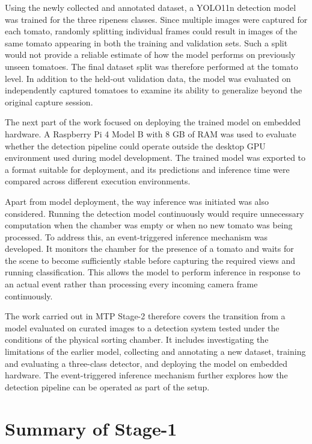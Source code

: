\documentclass[12pt,a4paper]{report}
\begin{document}
Using the newly collected and annotated dataset, a YOLO11n detection model was trained for the three ripeness classes. Since multiple images were captured for each tomato, randomly splitting individual frames could result in images of the same tomato appearing in both the training and validation sets. Such a split would not provide a reliable estimate of how the model performs on previously unseen tomatoes. The final dataset split was therefore performed at the tomato level. In addition to the held-out validation data, the model was evaluated on independently captured tomatoes to examine its ability to generalize beyond the original capture session.

The next part of the work focused on deploying the trained model on embedded hardware. A Raspberry Pi 4 Model B with 8 GB of RAM was used to evaluate whether the detection pipeline could operate outside the desktop GPU environment used during model development. The trained model was exported to a format suitable for deployment, and its predictions and inference time were compared across different execution environments. 

Apart from model deployment, the way inference was initiated was also considered. Running the detection model continuously would require unnecessary computation when the chamber was empty or when no new tomato was being processed. To address this, an event-triggered inference mechanism was developed. It monitors the chamber for the presence of a tomato and waits for the scene to become sufficiently stable before capturing the required views and running classification. This allows the model to perform inference in response to an actual event rather than processing every incoming camera frame continuously.

The work carried out in MTP Stage-2 therefore covers the transition from a model evaluated on curated images to a detection system tested under the conditions of the physical sorting chamber. It includes investigating the limitations of the earlier model, collecting and annotating a new dataset, training and evaluating a three-class detector, and deploying the model on embedded hardware. The event-triggered inference mechanism further explores how the detection pipeline can be operated as part of the setup.

\chapter{Summary of Stage-1}
\end{document}
